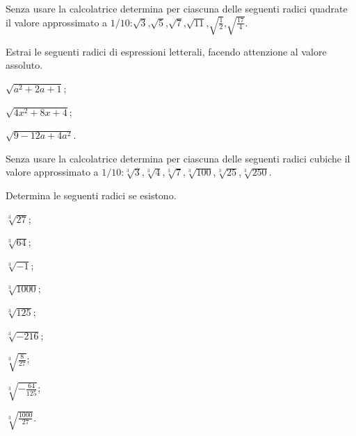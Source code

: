 \begin{esercizio}
 \label{ese:2.3}
Senza usare la calcolatrice determina per ciascuna delle seguenti radici quadrate il valore approssimato a $1/10$:\quad$\sqrt 3$,\quad$\sqrt 5$,\quad$\sqrt 7$,\quad$\sqrt{11}$,\quad$\sqrt{\frac 1 2}$,\quad$\sqrt{\frac{17} 4}$.
\end{esercizio}

\begin{esercizio}
 \label{ese:2.4}
Estrai le seguenti radici di espressioni letterali, facendo attenzione al valore assoluto.
\begin{multicols}{3}
\begin{enumeratea}
 \item $\sqrt{a^2+2a+1}$;
 \item $\sqrt{4x^2+8x+4}$;
 \item $\sqrt{9-12a+4a^2}$.
\end{enumeratea}
\end{multicols}
\end{esercizio}

 \begin{esercizio}
\label{ese:2.5}
Senza usare la calcolatrice determina per ciascuna delle seguenti radici cubiche il valore approssimato a $1/10$:\quad$\sqrt[3]3$,\quad$\sqrt[3]4$,\quad$\sqrt[3]7$,\quad$\sqrt[3]{100}$,\quad$\sqrt[3]{25}$,\quad$\sqrt[3]{250}$.
\end{esercizio}

\begin{esercizio}[\Ast]
 \label{ese:2.6}
Determina le seguenti radici se esistono.
 \begin{multicols}{3}
 \begin{enumeratea}
 \item $\sqrt[3]{27}$;
 \item $\sqrt[3]{64}$;
 \item $\sqrt[3]{-1}$;
 \item $\sqrt[3]{1000}$;
 \item $\sqrt[3]{125}$;
 \item $\sqrt[3]{-216}$;
 \item $\sqrt[3]{\frac 8{27}}$;
 \item $\sqrt[3]{-\frac{64}{125}}$;
 \item $\sqrt[3]{\frac{1000}{27}}$.
 \end{enumeratea}
 \end{multicols}
\end{esercizio}

